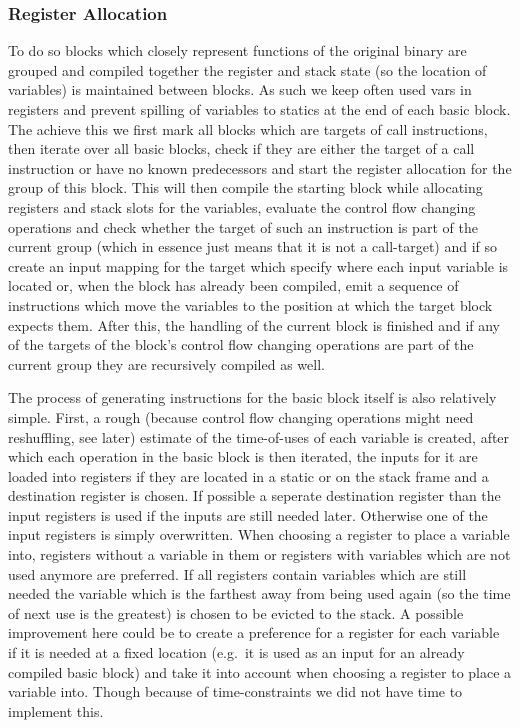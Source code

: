 \documentclass[course=eragp]{aspdoc}
\begin{document}
\subsubsection{Register Allocation}\label{reg_alloc}
To do so blocks which closely represent functions of the original binary are grouped and compiled together the register and stack state (so the location of variables) is maintained between blocks.
As such we keep often used vars in registers and prevent spilling of variables to statics at the end of each basic block.
The achieve this we first mark all blocks which are targets of call instructions, then iterate over
all basic blocks, check if they are either the target of a call instruction or have no known predecessors
and start the register allocation for the group of this block.
This will then compile the starting block while allocating registers and stack slots for the
variables, evaluate the control flow changing operations and check whether the target of such an instruction is part of the current group
(which in essence just means that it is not a call-target) and if so create an input mapping for the target which specify where each input variable is located or, when the block has already been compiled,
emit a sequence of instructions which move the variables to the position at which the target block expects them.
After this, the handling of the current block is finished and if any of the targets of the block's
control flow changing operations are part of the current group they are recursively compiled as well.

\par

The process of generating instructions for the basic block itself is also relatively simple. First,
a rough (because control flow changing operations might need reshuffling, see later) estimate of the time-of-uses of
each variable is created,
after which each operation in the basic block is then iterated, the inputs for it are loaded into registers if they are located in a static or on the stack frame and a destination register is chosen.
If possible a seperate destination register than the input registers is used if the inputs are still needed later. Otherwise one of the input registers is simply overwritten.
When choosing a register to place a variable into, registers without a variable in them or registers
with variables which are not used anymore are preferred. If all registers contain variables which
are still needed
the variable which is the farthest away from being used again (so the time of next use is the greatest) is chosen to be evicted to the stack.
A possible improvement here could be to create a preference for a register for each variable if it is needed at a fixed location (e.g.\ it is used as an input for an already compiled basic block)
and take it into account when choosing a register to place a variable into. Though because of
time-constraints we did not have time to implement this.
\end{document}

